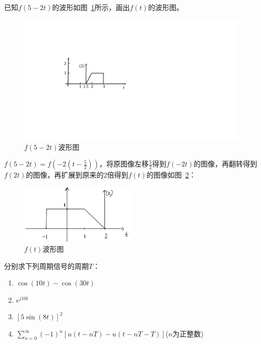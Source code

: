 \documentclass[answers]{exam}  %
\begin{document}
\begin{questions}
\question 已知$f(5-2t)$的波形如图~\ref{fig:q3-1}所示，画出$f(t)$的波形图。
\begin{figure}
	\centering
	\includegraphics{pics/q2-que.pdf}
	\caption{$f(5-2t)$波形图} \label{fig:q3-1}
\end{figure}

\begin{solution}
	$f(5-2t)=f(-2(t-\frac{5}{2}))$，将原图像左移$\frac{5}{2}$得到$f(-2t)$的图像，再翻转得到$f(2t)$的图像，再扩展到原来的2倍得到$f(t)$的图像如图~\ref{fig:q3-2}：
\end{solution}
\begin{figure}
	\centering
	\includegraphics[width=0.5\textwidth]{pics/q3.png}
	\caption{$f(t)$波形图} \label{fig:q3-2}
\end{figure}

\question 分别求下列周期信号的周期$T$：
\begin{enumerate}[(1)]
	\item $\cos(10t)-\cos(30t)$
	\item $e^{j10t}$
	\item $\left[5 \sin(8t) \right]^2$
	\item $\sum_{n=0}^{\infty} (-1)^n \left[ u(t-nT) - u(t-nT-T) \right]$($n$为正整数)
\end{enumerate}


\end{questions}
\end{document}

